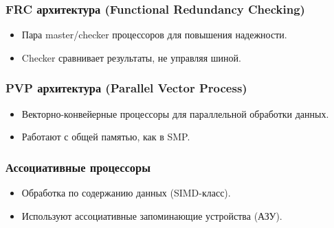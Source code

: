 	\subsubsection{FRC архитектура (Functional Redundancy Checking)}
	\begin{itemize}
		\item Пара master/checker процессоров для повышения надежности.
		\item Checker сравнивает результаты, не управляя шиной.
	\end{itemize}
	
	\subsubsection{PVP архитектура (Parallel Vector Process)}
	\begin{itemize}
		\item Векторно-конвейерные процессоры для параллельной обработки данных.
		\item Работают с общей памятью, как в SMP.
	\end{itemize}
	
	\subsubsection{Ассоциативные процессоры}
	\begin{itemize}
		\item Обработка по содержанию данных (SIMD-класс).
		\item Используют ассоциативные запоминающие устройства (АЗУ).
	\end{itemize}
	
	\newpage
	
